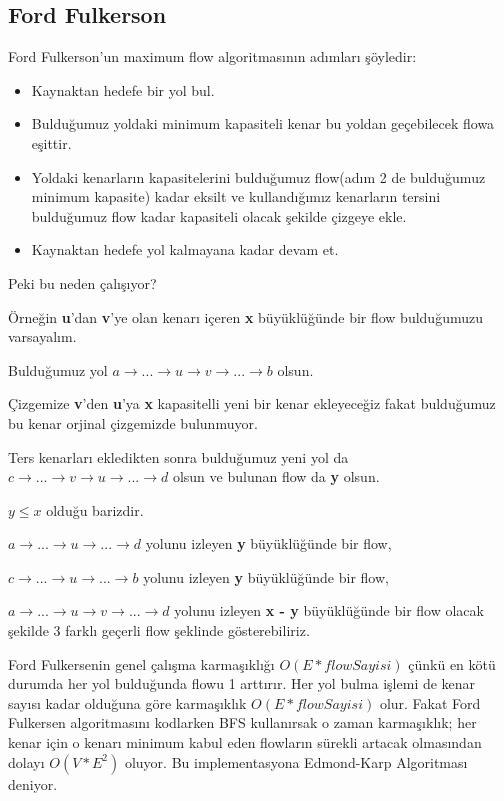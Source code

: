 \documentclass[12pt]{article}
\begin{document}
    \subsection{Ford Fulkerson}
    Ford Fulkerson'un maximum flow algoritmasının adımları şöyledir:
    \begin{itemize}
    \item Kaynaktan hedefe bir yol bul.
    \item Bulduğumuz yoldaki minimum kapasiteli kenar bu yoldan geçebilecek flowa eşittir.
    
    \item Yoldaki kenarların kapasitelerini bulduğumuz flow(adım 2 de bulduğumuz minimum kapasite) kadar eksilt ve kullandığımız kenarların tersini bulduğumuz flow kadar kapasiteli olacak şekilde çizgeye ekle.
    
    \item Kaynaktan hedefe yol kalmayana kadar devam et.
    \end{itemize}


    Peki bu neden çalışıyor?

    Örneğin \textbf{u}'dan \textbf{v}'ye olan kenarı içeren \textbf{x} büyüklüğünde bir flow bulduğumuzu varsayalım.
    
    Bulduğumuz yol $a \rightarrow ... \rightarrow u \rightarrow v \rightarrow ... \rightarrow b$ olsun.
    
    Çizgemize \textbf{v}'den \textbf{u}'ya \textbf{x} kapasitelli yeni bir kenar ekleyeceğiz fakat bulduğumuz bu kenar orjinal çizgemizde bulunmuyor.

    Ters kenarları ekledikten sonra bulduğumuz yeni yol da $c \rightarrow ... \rightarrow v \rightarrow u \rightarrow ... \rightarrow d$ olsun ve bulunan flow da \textbf{y} olsun.

    $y \leq x$  olduğu barizdir.

    $a \rightarrow ... \rightarrow u \rightarrow ... \rightarrow d$ yolunu izleyen \textbf{y} büyüklüğünde bir flow,

    $c \rightarrow ... \rightarrow u \rightarrow ... \rightarrow b$ yolunu izleyen \textbf{y} büyüklüğünde bir flow,

    $a \rightarrow ... \rightarrow u \rightarrow v \rightarrow ... \rightarrow d$ yolunu izleyen  \textbf{x - y} büyüklüğünde bir flow olacak şekilde 3 farklı geçerli flow şeklinde gösterebiliriz.

    Ford Fulkersenin genel çalışma karmaşıklığı $O(E * flowSayisi)$ çünkü en kötü durumda her yol bulduğunda flowu 1 arttırır. Her yol bulma işlemi de kenar sayısı kadar olduğuna göre karmaşıklık $O(E * flowSayisi)$ olur.
    Fakat Ford Fulkersen algoritmasını kodlarken BFS kullanırsak o zaman karmaşıklık; her kenar için o kenarı minimum kabul eden flowların sürekli artacak olmasından dolayı $O(V*E^2)$ oluyor. Bu implementasyona Edmond-Karp Algoritması deniyor.
    \cleardoublepage
    
\end{document}

